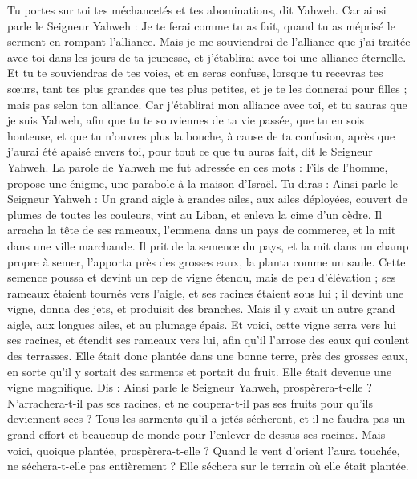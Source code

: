 \begin{multicols}{2}
Tu portes sur toi tes méchancetés et tes abominations, dit Yahweh.
Car ainsi parle le Seigneur Yahweh : Je te ferai comme tu as fait, quand tu as méprisé le serment en rompant l'alliance.
Mais je me souviendrai de l'alliance que j'ai traitée avec toi dans les jours de ta jeunesse, et j'établirai avec toi une alliance éternelle.
Et tu te souviendras de tes voies, et en seras confuse, lorsque tu recevras tes sœurs, tant tes plus grandes que tes plus petites, et je te les donnerai pour filles ; mais pas selon ton alliance.
Car j'établirai mon alliance avec toi, et tu sauras que je suis Yahweh,
afin que tu te souviennes de ta vie passée, que tu en sois honteuse, et que tu n'ouvres plus la bouche, à cause de ta confusion, après que j'aurai été apaisé envers toi, pour tout ce que tu auras fait, dit le Seigneur Yahweh.
\VerseOne{}La parole de Yahweh me fut adressée en ces mots :
Fils de l'homme, propose une énigme, une parabole à la maison d'Israël.
Tu diras : Ainsi parle le Seigneur Yahweh : Un grand aigle à grandes ailes, aux ailes déployées, couvert de plumes de toutes les couleurs, vint au Liban, et enleva la cime d'un cèdre.
Il arracha la tête de ses rameaux, l'emmena dans un pays de commerce, et la mit dans une ville marchande.
Il prit de la semence du pays, et la mit dans un champ propre à semer, l'apporta près des grosses eaux, la planta comme un saule.
Cette semence poussa et devint un cep de vigne étendu, mais de peu d'élévation ; ses rameaux étaient tournés vers l'aigle, et ses racines étaient sous lui ; il devint une vigne, donna des jets, et produisit des branches.
Mais il y avait un autre grand aigle, aux longues ailes, et au plumage épais. Et voici, cette vigne serra vers lui ses racines, et étendit ses rameaux vers lui, afin qu'il l'arrose des eaux qui coulent des terrasses.
Elle était donc plantée dans une bonne terre, près des grosses eaux, en sorte qu'il y sortait des sarments et portait du fruit. Elle était devenue une vigne magnifique.
Dis : Ainsi parle le Seigneur Yahweh, prospèrera-t-elle ? N'arrachera-t-il pas ses racines, et ne coupera-t-il pas ses fruits pour qu'ils deviennent secs ? Tous les sarments qu'il a jetés sécheront, et il ne faudra pas un grand effort et beaucoup de monde pour l'enlever de dessus ses racines.
Mais voici, quoique plantée, prospèrera-t-elle ? Quand le vent d'orient l'aura touchée, ne séchera-t-elle pas entièrement ? Elle séchera sur le terrain où elle était plantée.

\end{multicols}
